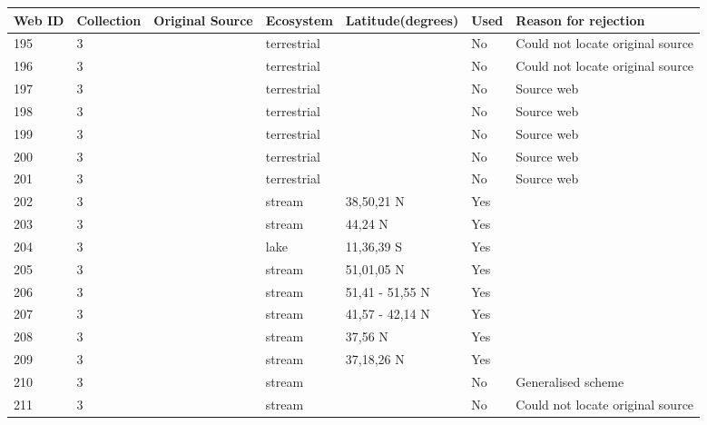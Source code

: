 \documentclass[12pt]{article}
\begin{document}
\begin{landscape}
        \newpage

    \begin{table}[h!]
    \centering
    {\footnotesize
      \begin{tabular}{p{2.8cm}p{1.3cm}p{3cm}p{2.2cm}p{2.5cm}lp{8.2cm}}
        \hline
        Web ID & Collection & Original Source & Ecosystem & Latitude(degrees) & Used  & Reason for rejection  \\
        \hline
        195   & 3 & \cite{Schoenly1983a}    & terrestrial &       & No    & Could not locate original source \\
        196   & 3 & \cite{Schoenly1983a}    & terrestrial &       & No    & Could not locate original source \\
        197   & 3 & \cite{Mohr1943}    & terrestrial &       & No    & Source web \\
        198   & 3 & \cite{Schoenly1983}  & terrestrial &       & No    & Source web \\
        199   & 3 & \cite{Valiela1969}    & terrestrial &       & No    & Source web \\
        200   & 3 & \cite{Valiela1974}    & terrestrial &       & No    & Source web \\
        201   & 3 & \cite{Valiela1974}    & terrestrial &       & No    & Source web \\
        202   & 3 & \cite{Allan1982}    & stream & 38,50,21 N & Yes  &    \\
        203   & 3 & \cite{Collins1976}    & stream & 44,24 N & Yes   &       \\
        204   & 3 & \cite{Fryer1959} & lake  & 11,36,39 S & Yes   &       \\
        205   & 3 & \cite{Hildrew1985}     & stream & 51,01,05 N & Yes   &       \\
        206   & 3 & \cite{Jones1949}     & stream & 51,41 - 51,55 N & Yes   &       \\
        207   & 3 & \cite{Koslucher1973}    & stream & 41,57 - 42,14 N & Yes   &       \\
        208   & 3 & \cite{Minckley1963}    & stream & 37,56 N & Yes   &       \\
        209   & 3 & \cite{Minshall1967}    & stream & 37,18,26 N & Yes   &       \\
        210   & 3 & \cite{Percival1929}     & stream &       & No    & Generalised scheme \\
        211   & 3 & \cite{Ricker1935}  & stream &       & No    & Could not locate original source \\

\end{tabular}}
\end{table}
\end{landscape}
\end{document}
